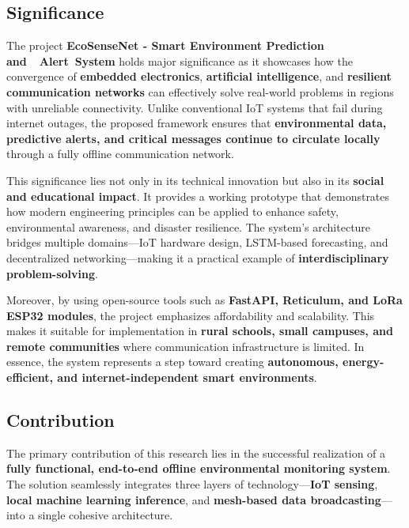 \subsection{Significance}

The project \textbf{EcoSenseNet - Smart Environment Prediction and  Alert System} holds major significance as it showcases how the convergence of \textbf{embedded electronics}, \textbf{artificial intelligence}, and \textbf{resilient communication networks} can effectively solve real-world problems in regions with unreliable connectivity.
Unlike conventional IoT systems that fail during internet outages, the proposed framework ensures that \textbf{environmental data, predictive alerts, and critical messages continue to circulate locally} through a fully offline communication network.

This significance lies not only in its technical innovation but also in its \textbf{social and educational impact}. It provides a working prototype that demonstrates how modern engineering principles can be applied to enhance safety, environmental awareness, and disaster resilience. The system’s architecture bridges multiple domains—IoT hardware design, LSTM-based forecasting, and decentralized networking—making it a practical example of \textbf{interdisciplinary problem-solving}.

Moreover, by using open-source tools such as \textbf{FastAPI, Reticulum, and LoRa ESP32 modules}, the project emphasizes affordability and scalability. This makes it suitable for implementation in \textbf{rural schools, small campuses, and remote communities} where communication infrastructure is limited. In essence, the system represents a step toward creating \textbf{autonomous, energy-efficient, and internet-independent smart environments}.

\subsection{Contribution}

The primary contribution of this research lies in the successful realization of a \textbf{fully functional, end-to-end offline environmental monitoring system}. The solution seamlessly integrates three layers of technology—\textbf{IoT sensing}, \textbf{local machine learning inference}, and \textbf{mesh-based data broadcasting}—into a single cohesive architecture.

